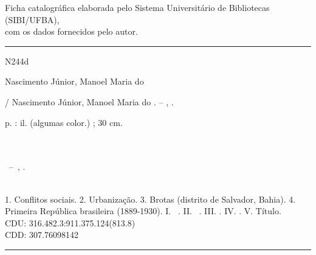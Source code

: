 
%
%     
\begin{fichacatalografica}
	\vspace*{\fill}					%
\centering Ficha catalográfica elaborada pelo Sistema Universitário de Bibliotecas (SIBI/UFBA), \\ com os dados fornecidos pelo autor.

	\hrule							%
N244d
	\begin{center}					%
	\begin{minipage}[c]{12.5cm}		%
	
	Nascimento Júnior, Manoel Maria do %
	
	\hspace{0.5cm} \imprimirtitulo  / Nascimento Júnior, Manoel Maria do %
	. -- \imprimirlocal, \imprimirdata .
	
	\hspace{0.5cm} \pageref{LastPage} p. : il. (algumas color.) ; 30 cm.\\
	
	\hspace{0.5cm} \imprimirorientadoraRotulo~\imprimirorientadora\\
	
	\hspace{0.5cm} \imprimircoorientadoraRotulo~\imprimircoorientadora\\
	
	\hspace{0.5cm}
	\parbox[t]{\textwidth}{\imprimirtipotrabalho~--~\imprimirinstituicao,
	\imprimirdata.}\\
	
	\hspace{0.5cm}
		1. Conflitos sociais.
		2. Urbanização.
		3. Brotas (distrito de Salvador, Bahia).
		4. Primeira República brasileira (1889-1930).
		I. \imprimirorientadoraRotulo~\imprimirorientadora.
		II. \imprimircoorientadoraRotulo~\imprimircoorientadora.
		III. \imprimirinstituicao.
		IV. \imprimirfaculdade.
		V. Título.\\ 			
	
	\hspace{7cm} CDU: 316.482.3:911.375.124(813.8)\\
	\hspace{7cm} CDD: 307.76098142\\
	
	\end{minipage}
	\end{center}
	\hrule
\end{fichacatalografica}
